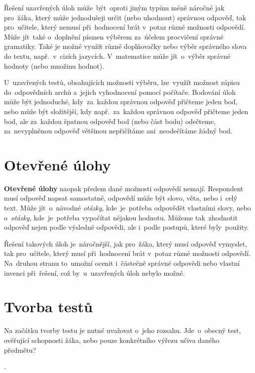 \documentclass[11pt,a4paper]{report}
\begin{document}
            Řešení uzavřených úloh může~být~oproti jiným typům méně náročné jak pro~žáka, který může jednodušeji určit (nebo uhodnout) správnou odpověď, tak pro~učitele, který nemusí při~hodnocení brát v~potaz různé možnosti odpovědí. 
            Může jít~také o~doplnění písmen výběrem za~účelem procvičení správné gramatiky. Také je možné využít různé doplňovačky nebo výběr správného slova do textu, např.~v~cizích jazycích. V~matematice může jít~o~výběr správné hodnoty (nebo množinu hodnot). 
            
            U~uzavřených testů, obsahujících možnosti výběru, lze~využít možnost zápisu do~odpovědních archů a~jejich vyhodnocení pomocí počítače.
            Bodování úloh může být jednoduché, kdy~za~každou správnou odpověď přičteme jeden bod, nebo může být složitější, kdy např.~za~každou správnou odpověď přičteme jeden bod, ale za~každou špatnou odpověď bod (nebo část bodu) odečteme, za~nevyplněnou odpověď většinou nepřičítáme ani~neodečítáme žádný bod.

        \section{Otevřené úlohy}
            \textbf{Otevřené úlohy} naopak předem dané možnosti odpovědí nemají. Respondent musí odpověď napsat samostatně, odpovědí může být slovo, věta, nebo i~celý text. Může jít~o~návodné \emph{otázky}, kde~je~potřeba odpovědět vlastními slovy, nebo o~\emph{otázky}, kde~je~potřeba vypočítat nějakou hodnotu. Můžeme tak~zhodnotit odpověď nejen podle výsledné odpovědi, ale i~podle postupů, které byly~použity.

            Řešení takových úloh je~náročnější, jak pro~žáka, který musí odpověď vymyslet, tak pro~učitele, který musí při~hodnocení brát v~potaz různé možnosti odpovědí. Na~druhou stranu to~umožní ocenit i~částečně správné odpovědi nebo vlastní invenci při~řešení, což by~u~uzavřených úloh nebylo možné. \cite{rozhlasOUtazky}

        \section{Tvorba testů}
            Na začátku tvorby testu je nutné uvažovat o~jeho rozsahu. Jde~o~obecný test, ověřující schopnosti žáka, nebo pouze konkrétního výřezu učiva daného předmětu?

            . \cite{Suchoradsky:testy}
            
\end{document}
